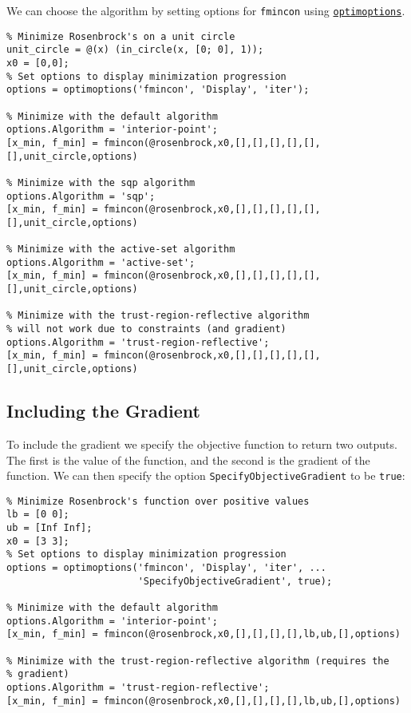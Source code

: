 \documentclass[12pt, a4paper]{article}
\begin{document}
We can choose the algorithm by setting options for \texttt{fmincon} using \href{https://www.mathworks.com/help/optim/ug/optimoptions.html?s\_tid=doc\_ta}{\texttt{optimoptions}}.
\lstset{language=matlab,label= ,caption= ,captionpos=b,firstnumber=1,numbers=left,style=Matlab-editor}
\begin{lstlisting}
% Minimize Rosenbrock's on a unit circle
unit_circle = @(x) (in_circle(x, [0; 0], 1));
x0 = [0,0];
% Set options to display minimization progression
options = optimoptions('fmincon', 'Display', 'iter');

% Minimize with the default algorithm
options.Algorithm = 'interior-point';
[x_min, f_min] = fmincon(@rosenbrock,x0,[],[],[],[],[],[],unit_circle,options)

% Minimize with the sqp algorithm
options.Algorithm = 'sqp';
[x_min, f_min] = fmincon(@rosenbrock,x0,[],[],[],[],[],[],unit_circle,options)

% Minimize with the active-set algorithm
options.Algorithm = 'active-set';
[x_min, f_min] = fmincon(@rosenbrock,x0,[],[],[],[],[],[],unit_circle,options)

% Minimize with the trust-region-reflective algorithm
% will not work due to constraints (and gradient)
options.Algorithm = 'trust-region-reflective';
[x_min, f_min] = fmincon(@rosenbrock,x0,[],[],[],[],[],[],unit_circle,options)
\end{lstlisting}
\subsection{Including the Gradient}
\label{sec:org1825faa}
To include the gradient we specify the objective function to return two outputs.
The first is the value of the function, and the second is the gradient of the function.
We can then specify the option \texttt{SpecifyObjectiveGradient} to be \texttt{true}:
\lstset{language=matlab,label= ,caption= ,captionpos=b,firstnumber=1,numbers=left,style=Matlab-editor}
\begin{lstlisting}
% Minimize Rosenbrock's function over positive values
lb = [0 0];
ub = [Inf Inf];
x0 = [3 3];
% Set options to display minimization progression
options = optimoptions('fmincon', 'Display', 'iter', ...
                       'SpecifyObjectiveGradient', true);

% Minimize with the default algorithm
options.Algorithm = 'interior-point';
[x_min, f_min] = fmincon(@rosenbrock,x0,[],[],[],[],lb,ub,[],options)

% Minimize with the trust-region-reflective algorithm (requires the
% gradient)
options.Algorithm = 'trust-region-reflective';
[x_min, f_min] = fmincon(@rosenbrock,x0,[],[],[],[],lb,ub,[],options)
\end{lstlisting}
\end{document}
